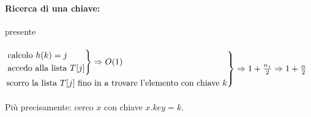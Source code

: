 \paragraph{Ricerca di una chiave:} presente \\~\\
$\begin{rcases}
    \begin{rcases}
        \text{calcolo } h(k) = j \\
        \text{accedo alla lista } T[j]
    \end{rcases}
    \Rightarrow O(1) \\
    \text{scorro la lista } T[j] \text{ fino in a trovare l'elemento con chiave } k
\end{rcases} \Rightarrow 1+\frac{n_j}{2} \Rightarrow 1+\frac{\alpha}{2}$ \\~\\

Più precisamente: cerco $x$ con chiave $x.key = k$.
